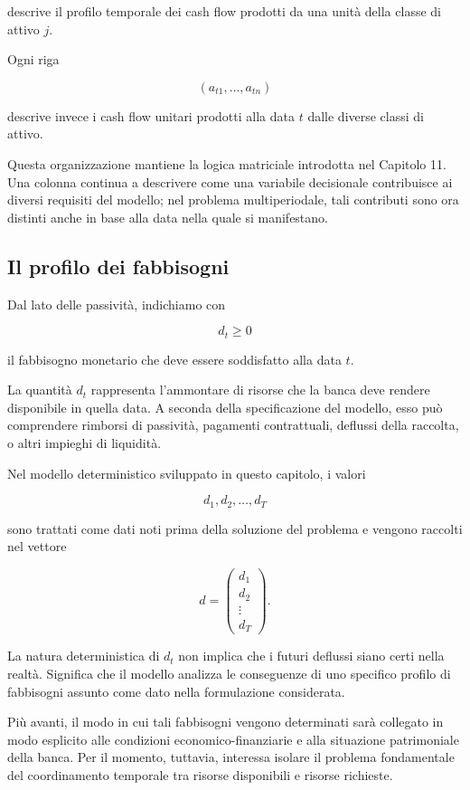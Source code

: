 \noindent descrive il profilo temporale dei cash flow prodotti da una unit\`a della
classe di attivo $j$.

Ogni riga

\[
(a_{t1},\ldots,a_{tn})
\]

\noindent descrive invece i cash flow unitari prodotti alla data $t$ dalle diverse
classi di attivo.

Questa organizzazione mantiene la logica matriciale introdotta nel
Capitolo 11. Una colonna continua a descrivere come una variabile decisionale
contribuisce ai diversi requisiti del modello; nel problema multiperiodale,
tali contributi sono ora distinti anche in base alla data nella quale si
manifestano.

\subsection{Il profilo dei fabbisogni}

Dal lato delle passivit\`a, indichiamo con

\[
d_t\geq0
\]

\noindent il fabbisogno monetario che deve essere soddisfatto alla data $t$.

La quantit\`a $d_t$ rappresenta l'ammontare di risorse che la banca deve
rendere disponibile in quella data. A seconda della specificazione del
modello, esso pu\`o comprendere rimborsi di passivit\`a, pagamenti
contrattuali, deflussi della raccolta, o altri impieghi di liquidit\`a.

Nel modello deterministico sviluppato in questo capitolo, i valori

\[
d_1,d_2,\ldots,d_T
\]

\noindent sono trattati come dati noti prima della soluzione del problema e vengono
raccolti nel vettore

\[
d=
\begin{pmatrix}
d_1\\
d_2\\
\vdots\\
d_T
\end{pmatrix}.
\]

La natura deterministica di $d_t$ non implica che i futuri deflussi siano
certi nella realt\`a. Significa che il modello analizza le conseguenze di uno
specifico profilo di fabbisogni assunto come dato nella formulazione
considerata.

Pi\`u avanti, il modo in cui tali fabbisogni vengono determinati sar\`a
collegato in modo esplicito alle condizioni economico-finanziarie e alla
situazione patrimoniale della banca. Per il momento, tuttavia, interessa
isolare il problema fondamentale del coordinamento temporale tra risorse
disponibili e risorse richieste.

